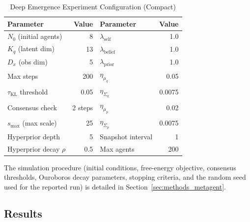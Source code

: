 \documentclass[11pt]{article}
\begin{document}
\begin{table}[htbp]
\centering
\caption{Deep Emergence Experiment Configuration (Compact)}
\label{tab:deep_emergence_compact}
\small
\begin{tabular}{lr|lr}
\toprule
\textbf{Parameter} & \textbf{Value} & \textbf{Parameter} & \textbf{Value} \\
\midrule
$N_0$ (initial agents) & 8 & $\lambda_{\text{self}}$ & 1.0 \\
$K_q$ (latent dim) & 13 & $\lambda_{\text{belief}}$ & 1.0 \\
$D_x$ (obs dim) & 5 & $\lambda_{\text{prior}}$ & 1.0 \\
Max steps & 200 & $\eta_{\mu_q}$ & 0.05 \\
$\tau_{\mathrm{KL}}$ threshold & 0.05 & $\eta_{\Sigma_q}$ & 0.0075 \\
Consensus check & 2 steps & $\eta_{\mu_p}$ & 0.02 \\
$s_{\max}$ (max scale) & 25 & $\eta_{\Sigma_p}$ & 0.0075 \\
Hyperprior depth & 5 & Snapshot interval & 1 \\
Hyperprior decay $\rho$ & 0.5 & Max agents & 200 \\
\bottomrule
\end{tabular}
\end{table}

The simulation procedure (initial conditions, free-energy objective, consensus thresholds, Ouroboros decay parameters, stopping criteria, and the random seed used for the reported run) is detailed in Section~\ref{sec:methods_metagent}.

\subsection{Results}
\end{document}
